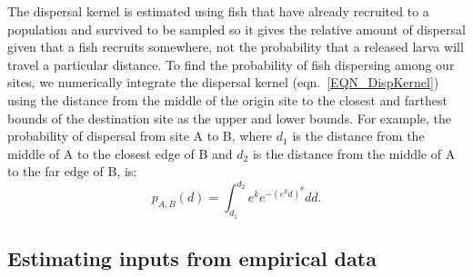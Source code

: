 \documentclass[12pt, oneside]{article}   	%
\begin{document}
The dispersal kernel is estimated using fish that have already recruited to a population and survived to be sampled so it gives the relative amount of dispersal given that a fish recruits somewhere, not the probability that a released larva will travel a particular distance. To find the probability of fish dispersing among our sites, we numerically integrate the dispersal kernel (eqn.\ \ref{EQN_DispKernel}) using the distance from the middle of the origin site to the closest and farthest bounds of the destination site as the upper and lower bounds. For example, the probability of dispersal from site A to B, where $d_1$ is the distance from the middle of A to the closest edge of B and $d_2$ is the distance from the middle of A to the far edge of B, is:
\begin{equation} %
p_{A, B}(d) = \int_{d_1}^{d_2} e^k e^{-(e^k d)^\theta}  dd. \label{EQN_integratingDK}
\end{equation}

\subsection*{Estimating inputs from empirical data} %


\end{document}
